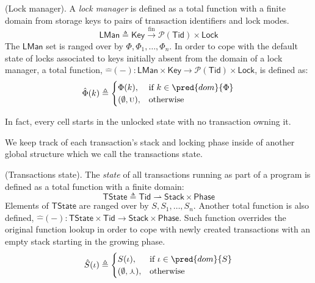 \begin{defn}
	(Lock manager).
	A \emph{lock manager} is defined as a total function with a finite domain from storage keys to pairs of transaction identifiers and lock modes.
	\[
		\mathsf{LMan} \triangleq \mathsf{Key} \xrightarrow{\text{fin}} \mathcal{P}(\mathsf{Tid}) \times \mathsf{Lock}
	\]
	The $\mathsf{LMan}$ set is ranged over by $\Phi, \Phi_1, \ldots, \Phi_n$. In order to cope with the default state of locks associated to keys initially absent from the domain of a lock manager, a total function, $\hat{-}(-) : \mathsf{LMan} \times \mathsf{Key} \rightarrow \mathcal{P}(\mathsf{Tid}) \times \mathsf{Lock}$, is defined as:
	\[
		\hat{\Phi}(k)
			\triangleq
		\begin{cases}
			\Phi(k), & \text{if } k \in \pred{dom}{\Phi} \\
			(\emptyset, \textsc{u}), & \text{otherwise}
		\end{cases}
	\]	
\end{defn}
In fact, every cell starts in the unlocked state with no transaction owning it.

We keep track of each transaction's stack and locking phase inside of another global structure which we call the transactions state.
\begin{defn}
	(Transactions state).
	The \emph{state} of all transactions running as part of a program is defined as a total function with a finite domain:
	\[
		\mathsf{TState} \triangleq \mathsf{Tid} \rightharpoonup \mathsf{Stack} \times \mathsf{Phase}
	\]
	Elements of $\mathsf{TState}$ are ranged over by $S, S_1, \ldots, S_n$. Another total function is also defined, $\hat{-}(-) : \mathsf{TState} \times \mathsf{Tid} \rightarrow \mathsf{Stack} \times \mathsf{Phase}$. Such function overrides the original function lookup in order to cope with newly created transactions with an empty stack starting in the growing phase.
	\[
		\hat{S}(\iota)
			\triangleq
		\begin{cases}
			S(\iota), & \text{if } \iota \in \pred{dom}{S} \\
			(\emptyset, \curlywedge), & \text{otherwise}
		\end{cases}
	\]	
\end{defn}